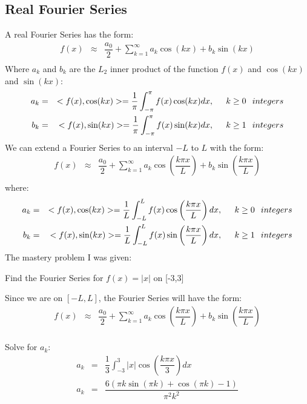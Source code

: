 \documentclass{article}
\newcommand{\bea}{\begin{eqnarray*}}
\newcommand{\eea}{\end{eqnarray*}}
\newcommand{\red}[1]{\textcolor{red}{#1}}
\begin{document}
\subsection{Real Fourier Series}
A real Fourier Series has the form:
\bea
f(x) &\approx& \dfrac{a_0}{2}+\sum_{k=1}^{\infty} a_k\cos(kx)+b_k\sin(kx) \\
\eea
Where $a_k$ and $b_k$ are the $L_2$ inner product of the function $f(x)$ and $\cos(kx)$ and $\sin(kx)$: 
\bea
a_k &=& <f(x),\cos(kx)> = \dfrac{1}{\pi}\int_{-\pi}^{\pi} f(x)\cos(kx)dx, \hspace{.2in} k\geq0 \hspace{.1in} integers \\
b_k &=& <f(x),\sin(kx)> = \dfrac{1}{\pi}\int_{-\pi}^{\pi} f(x)\sin(kx)dx, \hspace{.2in} k\geq1 \hspace{.1in} integers \\
\eea
We can extend a Fourier Series to an interval $-L$ to $L$ with the form:
\bea
f(x) &\approx& \dfrac{a_0}{2}+\sum_{k=1}^{\infty} a_k\cos\left(\dfrac{k \pi x}{L}\right)+b_k\sin\left(\dfrac{k \pi x}{L}\right) \\
\eea
where:
\bea
a_k &=& <f(x),\cos(kx)> = \dfrac{1}{L}\int_{-L}^{L} f(x)\cos\left(\dfrac{k \pi x}{L}\right)dx, \hspace{.2in}  k\geq0 \hspace{.1in} integers \\
b_k &=& <f(x),\sin(kx)> = \dfrac{1}{L}\int_{-L}^{L} f(x)\sin\left(\dfrac{k \pi x}{L}\right)dx, \hspace{.2in} k\geq1 \hspace{.1in} integers \\
\eea
The mastery problem I was given:\newline

Find the Fourier Series for $f(x)=|x|$ on [-3,3]\newline

Since we are on $[-L,L]$, the Fourier Series will have the form:
\bea
f(x) &\approx& \dfrac{a_0}{2}+\sum_{k=1}^{\infty} a_k\cos\left(\dfrac{k \pi x}{L}\right)+b_k\sin\left(\dfrac{k \pi x}{L}\right) \\
\eea

Solve for $a_k$:
\bea
a_k &=& \dfrac{1}{3}\int_{-3}^{3} |x|\cos\left(\dfrac{k \pi x}{3}\right)dx\\
a_k &=& \dfrac{6(\pi k \sin(\pi k)+\cos(\pi k) -1)}{\pi^2 k^2}\\
\eea
\end{document}
